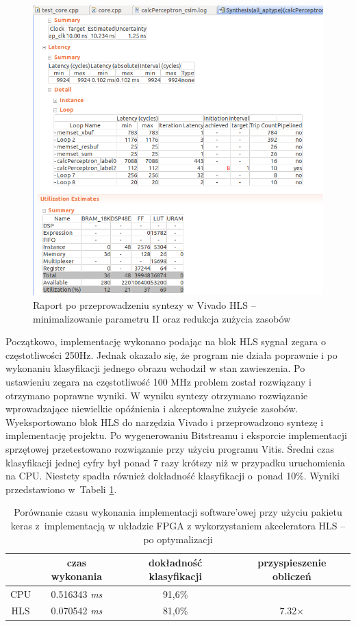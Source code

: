 \begin{figure}[!h]
  \centering
  \includegraphics[width=\textwidth]{img/hls-report4.png}
  \caption{Raport po przeprowadzeniu syntezy w Vivado HLS -- minimalizowanie parametru II oraz redukcja zużycia zasobów}
  \label{hls-report4}
\end{figure}

Początkowo, implementację wykonano podając na blok HLS sygnał zegara o częstotliwości 250Hz. Jednak okazało się, że program nie działa poprawnie i po wykonaniu klasyfikacji jednego obrazu wchodził w stan zawieszenia. Po ustawieniu zegara na częstotliwość 100 MHz problem został rozwiązany i otrzymano poprawne wyniki. W wyniku syntezy otrzymano rozwiązanie wprowadzające niewielkie opóźnienia i akceptowalne zużycie zasobów. 
Wyeksportowano blok HLS do narzędzia Vivado i przeprowadzono syntezę i implementację projektu. Po wygenerowaniu Bitstreamu i eksporcie implementacji sprzętowej przetestowano rozwiązanie przy użyciu programu Vitis. Średni czas klasyfikacji jednej cyfry był ponad 7 razy krótszy niż w przypadku uruchomienia na CPU. Niestety spadła również dokładność klasyfikacji o~ponad 10\%. Wyniki przedstawiono w~Tabeli \ref{tab:czas-wykonania2}.

\begin{table}[h] \centering
  \caption{Porównanie czasu wykonania implementacji software'owej przy użyciu pakietu keras z~implementacją w układzie FPGA z wykorzystaniem akceleratora HLS -- po optymalizacji} 
  \centering
  \begin{tabular} {c|c|c|c} \hline \label{tab:czas-wykonania2}
      
      & czas wykonania & dokładność klasyfikacji & przyspieszenie obliczeń\\ \hline
     CPU & 0.516343 \emph{ms} & 91,6\%  & \\
     HLS & 0.070542 \emph{ms} & 81,0\% & 7.32$\times$ \\
    \end{tabular}
  \end{table}

